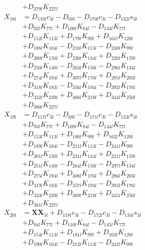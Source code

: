 \begin{multicols}{2}
\begin{align}
&+ D_{379l}K_{227l} \nonumber \\
X_{18l} &= D_{116l}c_{3l} - D_{68l} - D_{170l}c_{3l} - D_{132l}s_{3l}  \nonumber \\
&+ D_{92l}K_{77l} + D_{108l}K_{84l} - D_{143l}K_{77l}  \nonumber \\
&+ D_{152l}K_{113l} + D_{179l}K_{99l} + D_{161l}K_{120l}  \nonumber \\
&+ D_{188l}K_{104l} - D_{210l}K_{113l} - D_{240l}K_{99l}  \nonumber \\
&+ D_{200l}K_{150l} + D_{230l}K_{134l} + D_{220l}K_{159l}  \nonumber \\
&+ D_{250l}K_{140l} - D_{263l}K_{150l} - D_{296l}K_{134l}  \nonumber \\
&+ D_{274l}K_{194l} + D_{307l}K_{176l} + D_{285l}K_{203l}  \nonumber \\
&+ D_{318l}K_{183l} - D_{356l}K_{194l} - D_{392l}K_{176l}  \nonumber \\
&+ D_{332l}K_{239l} + D_{368l}K_{219l} + D_{344l}K_{250l}  \nonumber \\
&+ D_{380l}K_{227l} \nonumber \\
X_{19l} &= D_{117l}c_{3l} - D_{69l} - D_{171l}c_{3l} - D_{133l}s_{3l}  \nonumber \\
&+ D_{93l}K_{77l} + D_{109l}K_{84l} - D_{144l}K_{77l}  \nonumber \\
&+ D_{153l}K_{113l} + D_{180l}K_{99l} + D_{162l}K_{120l}  \nonumber \\
&+ D_{189l}K_{104l} - D_{211l}K_{113l} - D_{241l}K_{99l}  \nonumber \\
&+ D_{201l}K_{150l} + D_{231l}K_{134l} + D_{221l}K_{159l}  \nonumber \\
&+ D_{251l}K_{140l} - D_{264l}K_{150l} - D_{297l}K_{134l}  \nonumber \\
&+ D_{275l}K_{194l} + D_{308l}K_{176l} + D_{286l}K_{203l}  \nonumber \\
&+ D_{319l}K_{183l} - D_{357l}K_{194l} - D_{393l}K_{176l}  \nonumber \\
&+ D_{333l}K_{239l} + D_{369l}K_{219l} + D_{345l}K_{250l}  \nonumber \\
&+ D_{381l}K_{227l} \nonumber \\
X_{20l} &= \mathbf{XX}_{5l} + D_{118l}c_{3l} - D_{172l}c_{3l} - D_{134l}s_{3l}  \nonumber \\
&+ D_{94l}K_{77l} + D_{110l}K_{84l} - D_{145l}K_{77l}  \nonumber \\
&+ D_{154l}K_{113l} + D_{181l}K_{99l} + D_{163l}K_{120l}  \nonumber \\
&+ D_{190l}K_{104l} - D_{212l}K_{113l} - D_{242l}K_{99l}  \nonumber \\

\end{align}
\end{multicols}
